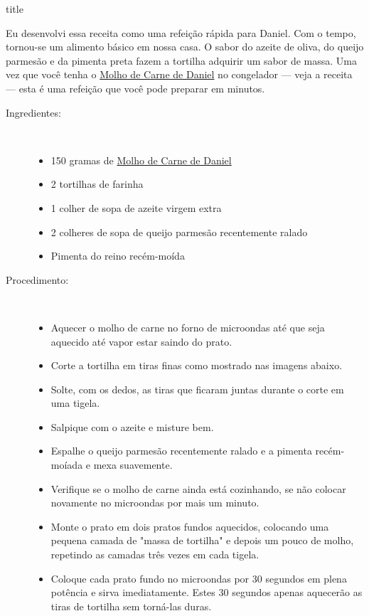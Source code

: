 \documentclass [11pt, letterpaper] {article}
\begin{document}
 {title}

Eu desenvolvi essa receita como uma refeição rápida para Daniel. Com o tempo, tornou-se um alimento básico em nossa casa. O sabor do azeite de oliva, do queijo parmesão e da pimenta preta fazem a tortilha adquirir um sabor de massa. Uma vez que você tenha o \href {DanielsMeatSauce.html} {Molho de Carne de Daniel} no congelador --- veja a receita --- esta é uma refeição que você pode preparar em minutos.

\vspace {0.3in}
\begin {description}

\item [Ingredientes:] \ \\
\begin {itemize}
\item 150 gramas de \href {DanielsMeatSauce.html} {Molho de Carne de Daniel}
\item 2 tortilhas de farinha
\item 1 colher de sopa de azeite virgem extra
\item 2 colheres de sopa de queijo parmesão recentemente ralado
\item Pimenta do reino recém-moída
\end {itemize}

\item [Procedimento:] \ \\
\begin {itemize}
\item Aquecer o molho de carne no forno de microondas até que seja aquecido até vapor estar saindo do prato.
\item Corte a tortilha em tiras finas como mostrado nas imagens abaixo.
\item Solte, com os dedos, as tiras que ficaram juntas durante o corte em uma tigela.
\item Salpique com o azeite e misture bem.
\item Espalhe o queijo parmesão recentemente ralado e a pimenta recém-mo\'iada e mexa suavemente.
\item Verifique se o molho de carne ainda está cozinhando, se não colocar novamente no microondas por mais um minuto.
\item Monte o prato em dois pratos fundos aquecidos, colocando uma pequena camada de "massa de tortilha" e depois um pouco de molho, repetindo as camadas três vezes em cada tigela.
\item Coloque cada prato fundo no microondas por 30 segundos em plena potência e sirva imediatamente. Estes 30 segundos apenas aquecerão as tiras de tortilha sem torná-las duras.
\end {itemize}
\end{description}
\end{document}
